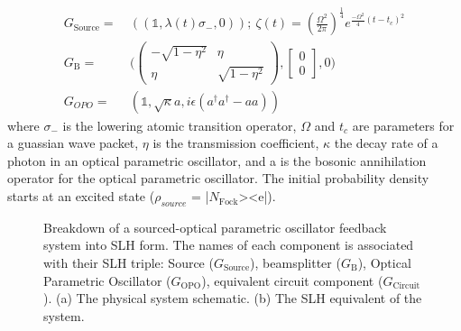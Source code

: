 \documentclass[a4paper]{article}
\begin{document}
\begin{align*}
    G_{\text{Source}} = & \ ((\mathbb{1}, \lambda(t) \sigma_-,0)); \ \zeta(t)  = (\frac{\Omega^2}{2\pi})^{\frac{1}{4}}e^{\frac{-\Omega^2}{4}(t-t_c)^2} \\
    G_{\text{B}} = & \ \Bigg( \begin{pmatrix} -\sqrt{1-\eta^2} & \eta \\ \eta & \sqrt{1-\eta^2} \end{pmatrix},\begin{bmatrix} 0 \\ 0\end{bmatrix}, 0 \Bigg) \\ 
    G_{OPO} = & \ (\mathbb{1}, \sqrt{\kappa}a, i\epsilon(a^\dagger a^\dagger - a a))
\end{align*}
where $\sigma_-$ is the lowering atomic transition operator, $\Omega$ and $t_c$ are parameters for a guassian wave packet, $\eta$ is the transmission coefficient, $\kappa$ the decay rate of a photon in an optical parametric oscillator, and a is the bosonic annihilation operator for the optical parametric oscillator. The initial probability density starts at an excited state ($\rho_{source}$ = |$N_{\text{Fock}}$><e|). 
\begin{figure}[H]
\centering
     \hspace{2cm}

     \caption{Breakdown of a sourced-optical parametric oscillator feedback system into SLH form. The names of each component is associated with their SLH triple: Source ($G_{\text{Source}}$), beamsplitter ($G_{\text{B}}$), Optical Parametric Oscillator ($G_{\text{OPO}}$), equivalent circuit component ($G_{\text{Circuit}}$). (a) The physical system schematic. (b) The SLH equivalent of the system.}
     \label{fig:SLH_form}
\end{figure}     
\end{document}
